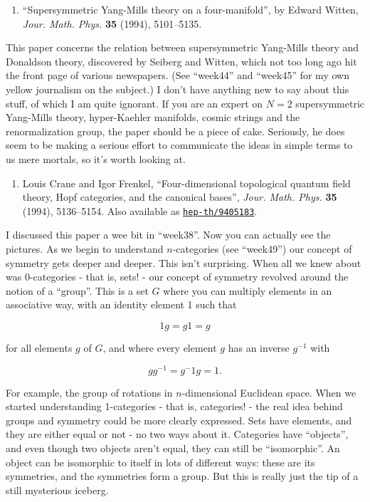 \documentclass{article}
\def\tightlist{}
\begin{document}
\begin{enumerate}
\def\labelenumi{\arabic{enumi})}
\tightlist
\item
  ``Supersymmetric Yang-Mills theory on a four-manifold'', by Edward
  Witten, \emph{Jour. Math. Phys.} \textbf{35} (1994), 5101--5135.
\end{enumerate}

This paper concerns the relation between supersymmetric Yang-Mills
theory and Donaldson theory, discovered by Seiberg and Witten, which not
too long ago hit the front page of various newspapers. (See ``week44''
and ``week45'' for my own yellow journalism on the subject.) I don't
have anything new to say about this stuff, of which I am quite ignorant.
If you are an expert on \(N = 2\) supersymmetric Yang-Mills theory,
hyper-Kaehler manifolds, cosmic strings and the renormalization group,
the paper should be a piece of cake. Seriously, he does seem to be
making a serious effort to communicate the ideas in simple terms to us
mere mortals, so it's worth looking at.

\begin{enumerate}
\def\labelenumi{\arabic{enumi})}
\setcounter{enumi}{1}
\tightlist
\item
  Louis Crane and Igor Frenkel, ``Four-dimensional topological quantum
  field theory, Hopf categories, and the canonical bases'', \emph{Jour.
  Math. Phys.} \textbf{35} (1994), 5136--5154. Also available as
  \href{http://xxx.lanl.gov/abs/hep-th/9405183}{\texttt{hep-th/9405183}}.
\end{enumerate}

I discussed this paper a wee bit in ``week38''. Now you can actually see
the pictures. As we begin to understand \(n\)-categories (see
``week49'') our concept of symmetry gets deeper and deeper. This isn't
surprising. When all we knew about was 0-categories - that is, sets! -
our concept of symmetry revolved around the notion of a ``group''. This
is a set \(G\) where you can multiply elements in an associative way,
with an identity element 1 such that

\[1g = g1 = g\]

for all elements \(g\) of \(G\), and where every element \(g\) has an
inverse \(g^{-1}\) with

\[gg^{-1} = g{^-1}g = 1.\]

For example, the group of rotations in \(n\)-dimensional Euclidean
space. When we started understanding 1-categories - that is, categories!
- the real idea behind groups and symmetry could be more clearly
expressed. Sets have elements, and they are either equal or not - no two
ways about it. Categories have ``objects'', and even though two objects
aren't equal, they can still be ``isomorphic''. An object can be
isomorphic to itself in lots of different ways: these are its
symmetries, and the symmetries form a group. But this is really just the
tip of a still mysterious iceberg.
\end{document}
